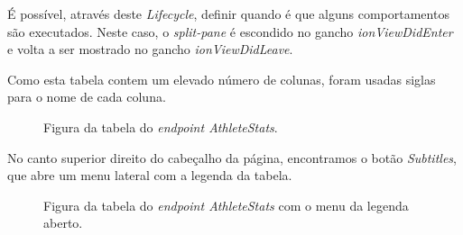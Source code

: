 É possível, através deste \textit{Lifecycle}, definir quando é que alguns comportamentos são executados. Neste caso, o \textit{split-pane} é escondido no gancho \textit{ionViewDidEnter}
e volta a ser mostrado no gancho \textit{ionViewDidLeave}.

Como esta tabela contem um elevado número de colunas, foram usadas siglas para o nome de cada coluna. 

\begin{figure}[h]
	\begin{center}
	\end{center}
	\caption{Figura da tabela do \textit{endpoint AthleteStats}.}\label{fig:athleteprofile}
\end{figure}
\newpage

No canto superior direito do cabeçalho da página, encontramos o botão \textit{Subtitles}, que abre um menu lateral com a legenda da tabela. 

\begin{figure}[h]
	\begin{center}
	\end{center}
	\caption{Figura da tabela do \textit{endpoint AthleteStats} com o menu da legenda aberto.}\label{fig:athleteprofile}
\end{figure}

